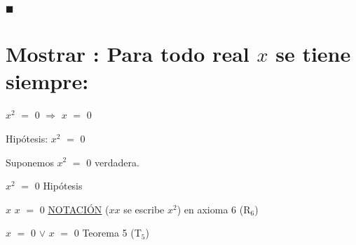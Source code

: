 \documentclass[12pt]{article}
\renewcommand{\qedsymbol}{$\blacksquare$}
\begin{document}
 \hspace{0.6cm} {\textcolor{carrotorange}{\qedsymbol}}
 
\newpage


\section{\textsf{Mostrar {} {}: Para todo real $x$ se tiene siempre:}} \vspace{.5cm}

{\LARGE{{} \hspace{.1cm} $x^{2}$ $=$ $0$ \hspace{0.2cm} $\Longrightarrow$ \hspace{0.2cm} $x$ $=$ $0$}} \vspace{.5cm}

{}  \vspace{0.5cm}

{} \vspace{0.5cm} 

{\textcolor{palatinateblue}{Hipótesis:} {\Large{$x^{2}$ $=$ $0$}}} \vspace{0.5cm}

{\textcolor{palatinateblue}{Suponemos}} {\Large{$x^{2}$ $=$ $0$}} {\textcolor{pakistangreen}{verdadera.}} \vspace{0.5cm}

$x^{2}$ $=$ $0$ \hspace{4.9cm} {\textcolor{palatinateblue}{Hipótesis}} \vspace{0.5cm}

$x$ $x$ $=$ $0$ \hspace{4.8cm} {\textcolor{carrotorange}{{\underline{NOTACIÓN}} ($xx$ se escribe $x^{2}$) en axioma 6 (R$_{6}$)}} \vspace{0.5cm}

$x$ $=$ $0$ \hspace{0.2cm} $\vee$ \hspace{0.2cm} $x$ $=$ $0$ \hspace{2.4cm} {\textcolor{carrotorange}{Teorema 5 (T$_{5}$)}} \vspace{0.5cm}
\end{document}
